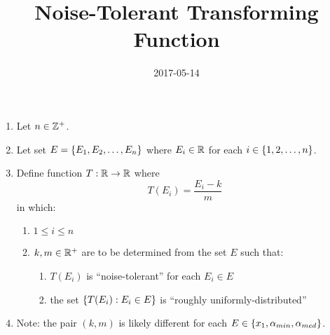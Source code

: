 \documentclass[12pt]{extarticle}
\title{Noise-Tolerant Transforming Function}
\author{}
\date{2017-05-14}
\begin{document}
\maketitle
\thispagestyle{fancy}


\begin{enumerate}
\item Let $n \in \mathbb{Z}^+$.
\item Let set $E = \left\{ E_1, E_2, \ldots, E_n \right\}$
  where $E_i \in \mathbb{R}$ for each $i \in \left\{ 1, 2, \ldots, n \right\}$.
\item Define function $T: \mathbb{R} \to \mathbb{R}$ where
  $$T(E_i) = \frac{E_i - k}{m}$$
  in which:
  \begin{enumerate}
  \item $1 \le i \le n$
  \item $k, m \in \mathbb{R}^+$ are to be determined
    from the set $E$ such that:
    \begin{enumerate}
    \item $T(E_i)$ is ``noise-tolerant''
      for each $E_i \in E$
    \item the set $\left\{ T(E_i) : E_i \in E \right\}$
      is ``roughly uniformly-distributed''
    \end{enumerate}
  \end{enumerate}
\item Note: the pair $(k, m)$ is likely different
  for each $E \in \left\{ x_1, \alpha_{min}, \alpha_{med} \right\}$.
\end{enumerate}
\cite[page 5/7, equation (5)]{article}



\end{document}
